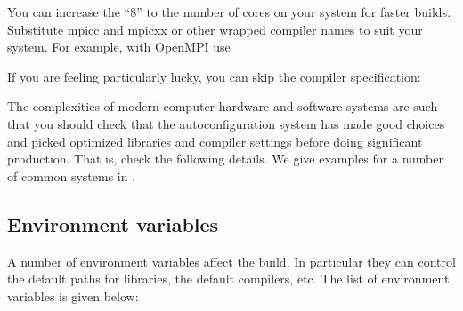 \documentclass[letterpaper,10pt,english]{sphinxmanual}
\begin{document}
You can increase the “8” to the number of cores on your system for
faster builds. Substitute mpicc and mpicxx or other wrapped compiler names to suit
your system. For example, with OpenMPI use

\begin{sphinxVerbatim}[commandchars=\\\{\}]
 
   
  
\end{sphinxVerbatim}

If you are feeling particularly lucky, you can skip the compiler specification:

\begin{sphinxVerbatim}[commandchars=\\\{\}]
 
 
  
\end{sphinxVerbatim}

The complexities of modern computer hardware and software systems are
such that you should check that the autoconfiguration system has made
good choices and picked optimized libraries and compiler settings
before doing significant production. That is, check the following details. We
give examples for a number of common systems in {\hyperref[\detokenize{installation:installexamples}]{}}.


\subsection{Environment variables}
\label{\detokenize{installation:environment-variables}}\label{\detokenize{installation:envvar}}
A number of environment variables affect the build.  In particular
they can control the default paths for libraries, the default
compilers, etc.  The list of environment variables is given below:

\begin{sphinxVerbatim}[commandchars=\\\{\}]
               
                
           
          
         
          
\end{sphinxVerbatim}
\end{document}
